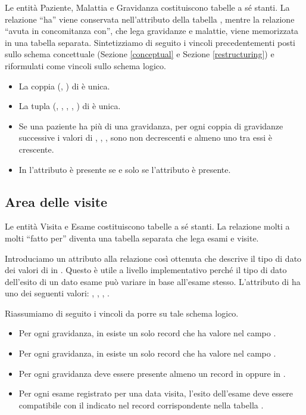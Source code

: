 Le entità Paziente, Malattia e Gravidanza costituiscono tabelle a sé stanti.
La relazione \enquote{ha} viene conservata nell'attributo  della tabella , mentre la relazione \enquote{avuta in concomitanza con}, che lega gravidanze e malattie, viene memorizzata in una tabella separata.
Sintetizziamo di seguito i vincoli precedentementi posti sullo schema concettuale (Sezione \ref{conceptual} e Sezione \ref{restructuring}) e riformulati come vincoli sullo schema logico.
\begin{itemize}
\item[\Con{}] La coppia (, ) di  è unica.
\item[\Con{}] La tupla (, , , , ) di  è unica.
\item[\Con{}] Se una paziente ha più di una gravidanza, per ogni coppia di gravidanze successive i valori di , , ,  sono non decrescenti e almeno uno tra essi è crescente.
\item[\Con{}] In  l'attributo  è presente se e solo se l'attributo  è presente.
\end{itemize}

\subsection{Area delle visite}

Le entità Visita e Esame costituiscono tabelle a sé stanti. La relazione molti a molti \enquote{fatto per} diventa una tabella separata che lega esami e visite.

Introduciamo un attributo  alla relazione  così ottenuta che descrive il tipo di dato dei valori di  in .
Questo è utile a livello implementativo perché il tipo di dato dell'esito di un dato esame può variare in base all'esame stesso.
L'attributo  di  ha uno dei seguenti valori: , , , .

Riassumiamo di seguito i vincoli da porre su tale schema logico.
\begin{itemize}
\item[\Con{}] Per ogni gravidanza, in  esiste un solo record che ha valore  nel campo .
\item[\Con{}] Per ogni gravidanza, in  esiste un solo record che ha valore  nel campo .
\item[\Con{}] Per ogni gravidanza deve essere presente almeno un record in  oppure in .
\item[\Con{}] Per ogni esame registrato per una data visita, l'esito dell'esame deve essere compatibile con il  indicato nel record corrispondente nella tabella .
\end{itemize}

